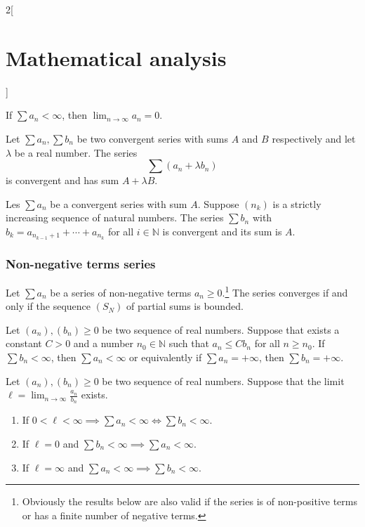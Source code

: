 \documentclass[class=article,crop=false]{standalone}
\begin{document}
\begin{multicols}{2}[\section{Mathematical analysis}]
\begin{corollary}
If $\sum a_n<\infty$, then $\displaystyle\lim_{n\to \infty} a_n=0$.
\end{corollary}
\begin{theorem}[Linearity]
Let $\sum a_n,\sum b_n$ be two convergent series with sums $A$ and $B$ respectively and let $\lambda$ be a real number. The series $$\sum (a_n+\lambda b_n)$$ is convergent and has sum $A+\lambda B$.
\end{theorem}
\begin{theorem}
Les $\sum a_n$ be a convergent series with sum $A$. Suppose $(n_k)$ is a strictly increasing sequence of natural numbers. The series $\sum b_n$ with $b_k=a_{n_{k-1}+1}+\cdots+a_{n_k}$ for all $i\in\mathbb{N}$ is convergent and its sum is $A$.
\end{theorem}
\subsubsection{Non-negative terms series}
\begin{theorem}
Let $\sum a_n$ be a series of non-negative terms $a_n\geq 0$.\footnote{Obviously the results below are also valid if the series is of non-positive terms or has a finite number of negative terms.} The series converges if and only if the sequence $(S_N)$ of partial sums is bounded.
\end{theorem}
\begin{theorem}
Let $(a_n),(b_n)\geq 0$ be two sequence of real numbers. Suppose that exists a constant $C>0$ and a number $n_0\in\mathbb{N}$ such that $a_n\leq Cb_n$ for all $n\geq n_0$. If $\sum b_n<\infty$, then $\sum a_n<\infty$ or equivalently if $\sum a_n=+\infty$, then $\sum b_n=+\infty$.
\end{theorem}
\begin{theorem}
Let $(a_n),(b_n)\geq 0$ be two sequence of real numbers. Suppose that the limit $\ell=\displaystyle\lim_{n\to\infty}\frac{a_n}{b_n}$ exists.
\begin{enumerate}
    \item If $0<\ell<\infty\implies\sum a_n<\infty\iff\sum b_n<\infty$.
    \item If $\ell=0$ and $\sum b_n<\infty\implies\sum a_n<\infty$.
    \item If $\ell=\infty$ and $\sum a_n<\infty\implies\sum b_n<\infty$.
\end{enumerate}
\end{theorem}
\begin{theorem}

\end{theorem}
\end{multicols}
\end{document}
